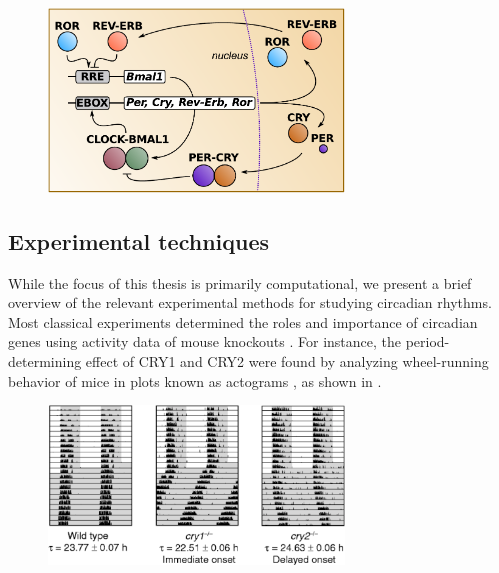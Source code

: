 \begin{figure}[tbp]
  \centering
  \includegraphics[width=0.7\textwidth]{chap1/figures/coreloop.pdf}
  \label{fig:coreloop}
\end{figure}

\subsection{Experimental techniques}

While the focus of this thesis is primarily computational, we present a brief overview of the relevant experimental methods for studying circadian rhythms.
Most classical experiments determined the roles and importance of circadian genes using activity data of mouse knockouts \cite{Vitaterna1994}.
For instance, the period-determining effect of CRY1 and CRY2 were found by analyzing wheel-running behavior of mice in plots known as actograms \cite{VanderHorst1999}, as shown in .

\begin{figure}[tbp]
  \centering
  \includegraphics[width=0.7\textwidth]{chap1/figures/vanderhorst.png}
  \label{fig:vanderhorst}
\end{figure}

